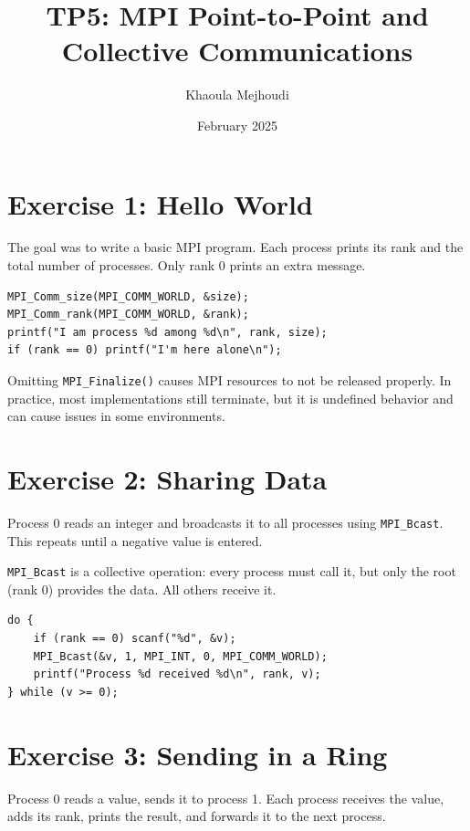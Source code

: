 \documentclass[11pt,a4paper]{article}
\title{\textbf{TP5: MPI Point-to-Point and Collective Communications}}
\author{Khaoula Mejhoudi}
\date{February 2025}
\begin{document}
\maketitle

\section{Exercise 1: Hello World}

The goal was to write a basic MPI program. Each process prints its rank and the total number of processes. Only rank 0 prints an extra message.

\begin{lstlisting}
MPI_Comm_size(MPI_COMM_WORLD, &size);
MPI_Comm_rank(MPI_COMM_WORLD, &rank);
printf("I am process %d among %d\n", rank, size);
if (rank == 0) printf("I'm here alone\n");
\end{lstlisting}

Omitting \texttt{MPI\_Finalize()} causes MPI resources to not be released properly. In practice, most implementations still terminate, but it is undefined behavior and can cause issues in some environments.

\section{Exercise 2: Sharing Data}

Process 0 reads an integer and broadcasts it to all processes using \texttt{MPI\_Bcast}. This repeats until a negative value is entered.

\texttt{MPI\_Bcast} is a collective operation: every process must call it, but only the root (rank 0) provides the data. All others receive it.

\begin{lstlisting}
do {
    if (rank == 0) scanf("%d", &v);
    MPI_Bcast(&v, 1, MPI_INT, 0, MPI_COMM_WORLD);
    printf("Process %d received %d\n", rank, v);
} while (v >= 0);
\end{lstlisting}

\section{Exercise 3: Sending in a Ring}

Process 0 reads a value, sends it to process 1. Each process receives the value, adds its rank, prints the result, and forwards it to the next process.
\end{document}
